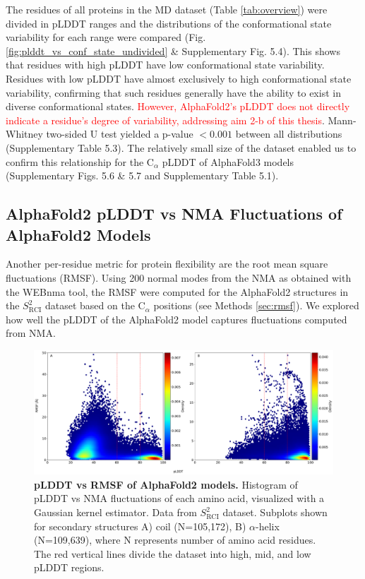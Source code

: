 The residues of all proteins in the MD dataset (Table \ref{tab:overview}) were divided in pLDDT ranges and the distributions of the conformational state variability for each range were compared (Fig. \ref{fig:plddt_vs_conf_state_undivided} \& Supplementary Fig. 5.4).
This shows that residues with high pLDDT have low conformational state variability. Residues with low pLDDT have almost exclusively to high conformational state variability, confirming that such residues generally have the ability to exist in diverse conformational states. \textcolor{red}{However, AlphaFold2's pLDDT does not directly indicate a residue's degree of variability, addressing aim 2-b of this thesis}. Mann-Whitney two-sided U test yielded a p-value \( < 0.001 \) between all distributions (Supplementary Table 5.3). 
The relatively small size of the dataset enabled us to confirm this relationship for the C$_\alpha$ pLDDT of AlphaFold3 models (Supplementary Figs. 5.6 \& 5.7 and Supplementary Table 5.1).

\subsection{AlphaFold2 pLDDT vs NMA Fluctuations of AlphaFold2 Models}

Another per-residue metric for protein flexibility are the root mean square fluctuations (RMSF). Using 200 normal modes from the NMA as obtained with the WEBnma tool, the RMSF were computed for the AlphaFold2 structures in the $S^2_{\text{RCI}}$ dataset based on the C$_\alpha$ positions (see Methods \ref{sec:rmsf}). 
We explored how well the pLDDT of the AlphaFold2 model captures fluctuations computed from NMA.

\begin{figure}[htb!]
    \centering
    \includegraphics[width=\textwidth]{pLDDT/plddt_figures/figures_bhawna/main_scatterplot_tr_RMSF_plddt_C_H_hexbin.pdf}
    \caption{\textbf{pLDDT vs RMSF of AlphaFold2 models.} Histogram of pLDDT vs NMA fluctuations of each amino acid, visualized with a Gaussian kernel estimator. Data from $S^{2}_{\text{RCI}}$ dataset. Subplots shown for secondary structures A) coil (N=105,172), B) $\alpha$-helix (N=109,639), where N represents number of amino acid residues. The red vertical lines divide the dataset into high, mid, and low pLDDT regions. 
    }
    \label{fig:plddt_vs_RMSF}
\end{figure}

